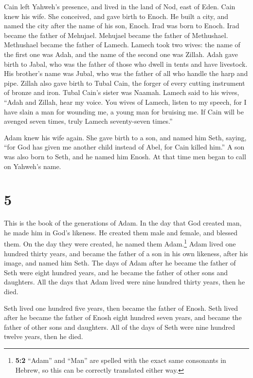  Cain left Yahweh's presence, and lived in the land of
Nod, east of Eden.  Cain knew his wife. She conceived,
and gave birth to Enoch. He built a city, and named the city after the
name of his son, Enoch.  Irad was born to Enoch. Irad
became the father of Mehujael. Mehujael became the father of Methushael.
Methushael became the father of Lamech.  Lamech took two
wives: the name of the first one was Adah, and the name of the second
one was Zillah.  Adah gave birth to Jabal, who was the
father of those who dwell in tents and have livestock. 
His brother's name was Jubal, who was the father of all who handle the
harp and pipe.  Zillah also gave birth to Tubal Cain, the
forger of every cutting instrument of bronze and iron. Tubal Cain's
sister was Naamah.  Lamech said to his wives, ``Adah and
Zillah, hear my voice. You wives of Lamech, listen to my speech, for I
have slain a man for wounding me, a young man for bruising me.
 If Cain will be avenged seven times, truly Lamech
seventy-seven times.''

 Adam knew his wife again. She gave birth to a son, and
named him Seth, saying, ``for God has given me another child instead of
Abel, for Cain killed him.''  A son was also born to
Seth, and he named him Enosh. At that time men began to call on Yahweh's
name.

\hypertarget{section-4}{%
\section{5}\label{section-4}}

 This is the book of the generations of Adam. In the day
that God created man, he made him in God's likeness.  He
created them male and female, and blessed them. On the day they were
created, he named them Adam.\footnote{\textbf{5:2} ``Adam'' and ``Man''
  are spelled with the exact same consonants in Hebrew, so this can be
  correctly translated either way.}  Adam lived one
hundred thirty years, and became the father of a son in his own
likeness, after his image, and named him Seth.  The days
of Adam after he became the father of Seth were eight hundred years, and
he became the father of other sons and daughters.  All the
days that Adam lived were nine hundred thirty years, then he died.

 Seth lived one hundred five years, then became the father
of Enosh.  Seth lived after he became the father of Enosh
eight hundred seven years, and became the father of other sons and
daughters.  All of the days of Seth were nine hundred
twelve years, then he died.

